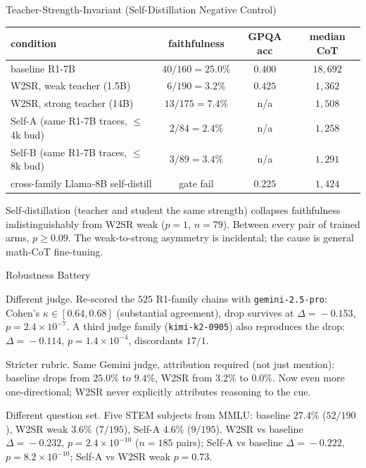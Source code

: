 \documentclass[final]{beamer}
\newlength{\colwidth}
\begin{document}
\begin{frame}[t]
\begin{columns}[t]
\begin{column}{\colwidth}
\begin{block}{Teacher-Strength-Invariant (Self-Distillation Negative Control)}
    \begin{center}
      \renewcommand{\arraystretch}{1.25}
      \small
      \begin{tabular}{lccc}
        \toprule
        condition & faithfulness & GPQA acc & median CoT \\
        \midrule
        baseline R1-7B               & $40/160 = 25.0\%$ & $0.400$ & $18{,}692$ \\
        W2SR, weak teacher (1.5B)    & $6/190  =  3.2\%$ & $0.425$ & $1{,}362$  \\
        W2SR, strong teacher (14B)   & $13/175 =  7.4\%$ & n/a    & $1{,}508$  \\
        Self-A (same R1-7B traces, $\le$4k bud) & $2/84 =  2.4\%$ & n/a & $1{,}258$ \\
        Self-B (same R1-7B traces, $\le$8k bud) & $3/89 =  3.4\%$ & n/a & $1{,}291$ \\
        \midrule
        cross-family Llama-8B self-distill & gate fail & $0.225$ & $1{,}424$ \\
        \bottomrule
      \end{tabular}
    \end{center}

    Self-distillation (teacher and student the same strength) collapses faithfulness indistinguishably from W2SR weak ($p \!=\! 1$, $n \!=\! 79$). Between every pair of trained arms, $p \!\ge\! 0.09$. The weak-to-strong asymmetry is incidental; the cause is general math-CoT fine-tuning.

  \end{block}

  \begin{block}{Robustness Battery}

    Different judge. Re-scored the $525$ R1-family chains with \texttt{gemini-2.5-pro}: Cohen's $\kappa \!\in\! [0.64, 0.68]$ (substantial agreement), drop survives at $\Delta \!=\! -0.153$, $p \!=\! 2.4 \!\times\! 10^{-7}$. A third judge family (\texttt{kimi-k2-0905}) also reproduces the drop: $\Delta \!=\! -0.114$, $p \!=\! 1.4 \!\times\! 10^{-4}$, discordants $17/1$.

    \smallskip
    Stricter rubric. Same Gemini judge, attribution required (not just mention): baseline drops from $25.0\%$ to $9.4\%$, W2SR from $3.2\%$ to $0.0\%$. Now even more one-directional; W2SR never explicitly attributes reasoning to the cue.

    \smallskip
    Different question set. Five STEM subjects from MMLU: baseline $27.4\%$ ($52/190$), W2SR weak $3.6\%$ ($7/195$), Self-A $4.6\%$ ($9/195$). W2SR vs baseline $\Delta \!=\! -0.232$, $p \!=\! 2.4 \!\times\! 10^{-10}$ ($n \!=\! 185$ pairs); Self-A vs baseline $\Delta \!=\! -0.222$, $p \!=\! 8.2 \!\times\! 10^{-10}$; Self-A vs W2SR weak $p \!=\! 0.73$.


\end{block}
\end{column}
\end{columns}
\end{frame}
\end{document}
